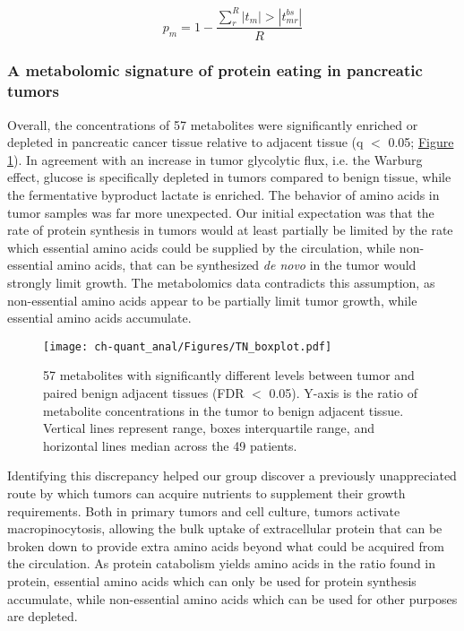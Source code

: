 \begin{equation}
p_{m} = 1 - \frac{\sum_{r}^{R}|t_{m}| > |t_{mr}^{bs}|}{R}\label{ch-quant_anal:bspval}
\end{equation}

\subsubsection{A metabolomic signature of protein eating in pancreatic tumors}

Overall, the concentrations of 57 metabolites were significantly enriched or depleted in pancreatic cancer tissue relative to adjacent tissue (q $<$ 0.05; \hyperref[ch-quant_anal:tnboxplot]{Figure \ref{ch-quant_anal:tnboxplot}}).  In agreement with an increase in tumor glycolytic flux, i.e. the Warburg effect, glucose is specifically depleted in tumors compared to benign tissue, while the fermentative byproduct lactate is enriched.  The behavior of amino acids in tumor samples was far more unexpected.  Our initial expectation was that the rate of protein synthesis in tumors would at least partially be limited by the rate which essential amino acids could be supplied by the circulation, while non-essential amino acids, that can be synthesized \textit{de novo} in the tumor would strongly limit growth. The metabolomics data contradicts this assumption, as non-essential amino acids appear to be partially limit tumor growth, while essential amino acids accumulate. 

\begin{figure}[h!]
\begin{center}
\texttt{[image: ch-quant\_anal/Figures/TN\_boxplot.pdf]}
\caption[Metabolites accumulated or depleted in pancreatic cancer]{57 metabolites with significantly different levels between tumor and paired benign adjacent tissues (FDR $<$ 0.05). Y-axis is the ratio of metabolite concentrations in the tumor to benign adjacent tissue. Vertical lines represent range, boxes interquartile range, and horizontal lines median across the 49 patients.}
\label{ch-quant_anal:tnboxplot}
\end{center}
\end{figure}

Identifying this discrepancy helped our group discover a previously unappreciated route by which tumors can acquire nutrients to supplement their growth requirements.  Both in primary tumors and cell culture, tumors activate macropinocytosis, allowing the bulk uptake of extracellular protein that can be broken down to provide extra amino acids beyond what could be acquired from the circulation. As protein catabolism yields amino acids in the ratio found in protein, essential amino acids which can only be used for protein synthesis accumulate, while non-essential amino acids which can be used for other purposes are depleted.  


